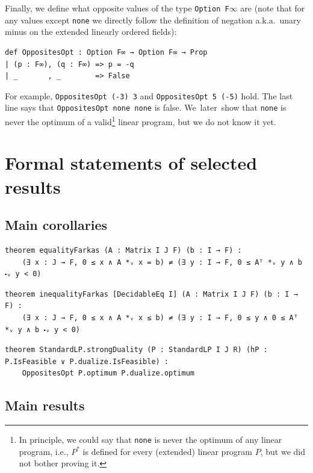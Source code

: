 \documentclass[]{article}
\renewcommand{\.}{\hskip .75pt}
\begin{document}
Finally, we define what opposite values of the type \texttt{Option F$\infty$} are
(note that for any values except \texttt{none} we directly follow the definition
of negation a.k.a.\ unary minus on the extended linearly ordered fields):
\begin{lstlisting}
def OppositesOpt : Option F∞ → Option F∞ → Prop
| (p : F∞), (q : F∞) => p = -q
| _       , _        => False
\end{lstlisting}
For example, \texttt{OppositesOpt (-3) 3} and \texttt{OppositesOpt 5 (-5)} hold.
The last line says that \texttt{OppositesOpt none none} is false.
We~later~show that \texttt{none} is never the optimum of a valid\footnote{
In principle, we could say that \texttt{none} is never the optimum of any
linear program, i.e., $P^\ast$ is defined for every (extended) linear program $P$,
but we did not bother proving it.} linear program, but we do not know it yet.


\section{Formal statements of selected results}
\label{statements}

\subsection{Main corollaries}

\begin{lstlisting}
theorem equalityFarkas (A : Matrix I J F) (b : I → F) :
    (∃ x : J → F, 0 ≤ x ∧ A *ᵥ x = b) ≠ (∃ y : I → F, 0 ≤ Aᵀ *ᵥ y ∧ b ⬝ᵥ y < 0)
\end{lstlisting}
\begin{lstlisting}
theorem inequalityFarkas [DecidableEq I] (A : Matrix I J F) (b : I → F) :
    (∃ x : J → F, 0 ≤ x ∧ A *ᵥ x ≤ b) ≠ (∃ y : I → F, 0 ≤ y ∧ 0 ≤ Aᵀ *ᵥ y ∧ b ⬝ᵥ y < 0)
\end{lstlisting}
\begin{lstlisting}
theorem StandardLP.strongDuality (P : StandardLP I J R) (hP : P.IsFeasible ∨ P.dualize.IsFeasible) :
    OppositesOpt P.optimum P.dualize.optimum
\end{lstlisting}

\subsection{Main results}
\end{document}
